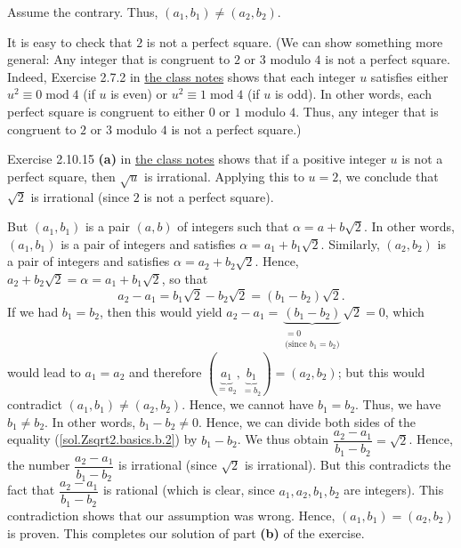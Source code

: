 \documentclass[paper=a4, fontsize=12pt]{scrartcl}%
\theoremstyle{plainsl}
\theoremstyle{definition}
\theoremstyle{remark}
\begin{document}
Assume the contrary. Thus, $\left(  a_{1},b_{1}\right)  \neq\left(
a_{2},b_{2}\right)  $.

It is easy to check that $2$ is not a perfect square. (We can show something
more general: Any integer that is congruent to $2$ or $3$ modulo $4$ is not a
perfect square. Indeed, Exercise 2.7.2 in
\href{http://www-users.math.umn.edu/~dgrinber/19s/notes.pdf}{the class notes}
shows that each integer $u$ satisfies either $u^{2}\equiv0\operatorname{mod}4$
(if $u$ is even) or $u^{2}\equiv1\operatorname{mod}4$ (if $u$ is odd). In
other words, each perfect square is congruent to either $0$ or $1$ modulo $4$.
Thus, any integer that is congruent to $2$ or $3$ modulo $4$ is not a perfect square.)

Exercise 2.10.15 \textbf{(a)} in
\href{http://www-users.math.umn.edu/~dgrinber/19s/notes.pdf}{the class notes}
shows that if a positive integer $u$ is not a perfect square, then $\sqrt{u}$
is irrational. Applying this to $u=2$, we conclude that $\sqrt{2}$ is
irrational (since $2$ is not a perfect square).

But $\left(  a_{1},b_{1}\right)  $ is a pair $\left(  a,b\right)  $ of
integers such that $\alpha=a+b\sqrt{2}$. In other words, $\left(  a_{1}%
,b_{1}\right)  $ is a pair of integers and satisfies $\alpha=a_{1}+b_{1}%
\sqrt{2}$. Similarly, $\left(  a_{2},b_{2}\right)  $ is a pair of integers and
satisfies $\alpha=a_{2}+b_{2}\sqrt{2}$. Hence, $a_{2}+b_{2}\sqrt{2}%
=\alpha=a_{1}+b_{1}\sqrt{2}$, so that%
\begin{equation}
a_{2}-a_{1}=b_{1}\sqrt{2}-b_{2}\sqrt{2}=\left(  b_{1}-b_{2}\right)  \sqrt{2}.
\label{sol.Zsqrt2.basics.b.2}%
\end{equation}
If we had $b_{1}=b_{2}$, then this would yield $a_{2}-a_{1}%
=\underbrace{\left(  b_{1}-b_{2}\right)  }_{\substack{=0\\\text{(since }%
b_{1}=b_{2}\text{)}}}\sqrt{2}=0$, which would lead to $a_{1}=a_{2}$ and
therefore $\left(  \underbrace{a_{1}}_{=a_{2}},\underbrace{b_{1}}_{=b_{2}%
}\right)  =\left(  a_{2},b_{2}\right)  $; but this would contradict $\left(
a_{1},b_{1}\right)  \neq\left(  a_{2},b_{2}\right)  $. Hence, we cannot have
$b_{1}=b_{2}$. Thus, we have $b_{1}\neq b_{2}$. In other words, $b_{1}%
-b_{2}\neq0$. Hence, we can divide both sides of the equality
(\ref{sol.Zsqrt2.basics.b.2}) by $b_{1}-b_{2}$. We thus obtain $\dfrac
{a_{2}-a_{1}}{b_{1}-b_{2}}=\sqrt{2}$. Hence, the number $\dfrac{a_{2}-a_{1}%
}{b_{1}-b_{2}}$ is irrational (since $\sqrt{2}$ is irrational). But this
contradicts the fact that $\dfrac{a_{2}-a_{1}}{b_{1}-b_{2}}$ is rational
(which is clear, since $a_{1},a_{2},b_{1},b_{2}$ are integers). This
contradiction shows that our assumption was wrong. Hence, $\left(  a_{1}%
,b_{1}\right)  =\left(  a_{2},b_{2}\right)  $ is proven. This completes our
solution of part \textbf{(b)} of the exercise.\\[0.4cm]
\end{document}
